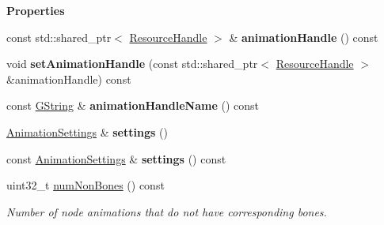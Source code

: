 \begin{Indent}\textbf{ Properties}\par
\begin{DoxyCompactItemize}
\item 
\mbox{\label{classrev_1_1_animation_clip_a37841a1e5660e84aababce95471f183a}} 
const std\+::shared\+\_\+ptr$<$ \mbox{\hyperlink{classrev_1_1_resource_handle}{Resource\+Handle}} $>$ \& {\bfseries animation\+Handle} () const
\item 
\mbox{\label{classrev_1_1_animation_clip_a69e6115289501d0243c75e6abba644c1}} 
void {\bfseries set\+Animation\+Handle} (const std\+::shared\+\_\+ptr$<$ \mbox{\hyperlink{classrev_1_1_resource_handle}{Resource\+Handle}} $>$ \&animation\+Handle) const
\item 
\mbox{\label{classrev_1_1_animation_clip_a03df3fc70b5619cc00e7f7c5e7d048da}} 
const \mbox{\hyperlink{classrev_1_1_g_string}{G\+String}} \& {\bfseries animation\+Handle\+Name} () const
\item 
\mbox{\label{classrev_1_1_animation_clip_a1bca598dc96d94f557734f8ffebb061f}} 
\mbox{\hyperlink{structrev_1_1_animation_settings}{Animation\+Settings}} \& {\bfseries settings} ()
\item 
\mbox{\label{classrev_1_1_animation_clip_aca98bf1f12d53a4c7fa21dbef8ec94ce}} 
const \mbox{\hyperlink{structrev_1_1_animation_settings}{Animation\+Settings}} \& {\bfseries settings} () const
\item 
\mbox{\label{classrev_1_1_animation_clip_ad2d6b51b2eb3c84d65af00d56b64b181}} 
uint32\+\_\+t \mbox{\hyperlink{classrev_1_1_animation_clip_ad2d6b51b2eb3c84d65af00d56b64b181}{num\+Non\+Bones}} () const
\begin{DoxyCompactList}\small\item\em Number of node animations that do not have corresponding bones. \end{DoxyCompactList}\end{DoxyCompactItemize}
\end{Indent}
